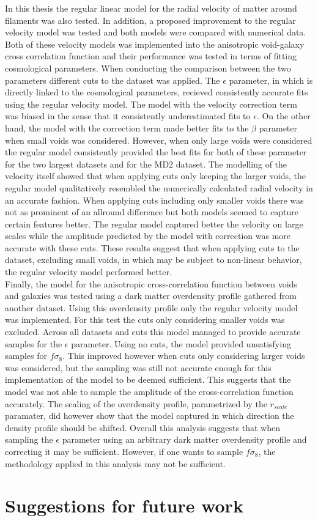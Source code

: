 In this thesis the regular linear model for the radial velocity of matter around filaments was also tested. In addition, a proposed improvement to the regular velocity model was tested and both models were compared with numerical data. Both of these velocity models was implemented into the anisotropic void-galaxy cross correlation function and their performance was tested in terms of fitting cosmological parameters. When conducting the comparison between the two parameters different cuts to the dataset was applied. The $\epsilon$ parameter, in which is directly linked to the cosmological parameters, recieved consistently accurate fits using the regular velocity model. The model with the velocity correction term was biased in the sense that it consistently underestimated fits to $\epsilon$. On the other hand, the model with the correction term made better fits to the $\beta$ parameter when small voids was considered. However, when only large voids were considered the regular model consistently provided the best fits for both of these parameter for the two largest datasets and for the MD2 dataset. The modelling of the velocity itself showed that when applying cuts only keeping the larger voids, the regular model qualitatively resembled the numerically calculated radial velocity in an accurate fashion. When applying cuts including only smaller voids there was not as prominent of an allround difference but both models seemed to capture certain features better. The regular model captured better the velocity on large scales while the amplitude predicted by the model with correction was more accurate with these cuts. These results suggest that when applying cuts to the dataset, excluding small voids, in which may be subject to non-linear behavior, the regular velocity model performed better.\\\indent
Finally, the model for the anisotropic cross-correlation function between voids and galaxies was tested using a dark matter overdensity profile gathered from another dataset. Using this overdensity profile only the regular velocity model was implemented. For this test the cuts only considering smaller voids was excluded. Across all datasets and cuts this model managed to provide accurate samples for the $\epsilon$ parameter. Using no cuts, the model provided unsatisfying samples for $f\sigma_8$. This improved however when cuts only considering larger voids was considered, but the sampling was still not accurate enough for this implementation of the model to be deemed sufficient.  This suggests that the model was not able to sample the amplitude of the cross-correlation function accurately. The scaling of the overdensity profile, parametrized by the $r_{scale}$ paramater, did however show that the model captured in which direction the density profile should be shifted. Overall this analysis suggests that when sampling the $\epsilon$ parameter using an arbitrary dark matter overdensity profile and correcting it may be sufficient. However, if one wants to sample $f\sigma_8$, the methodology applied in this analysis may not be sufficient.
\section{Suggestions for future work}\label{sec:futurework}